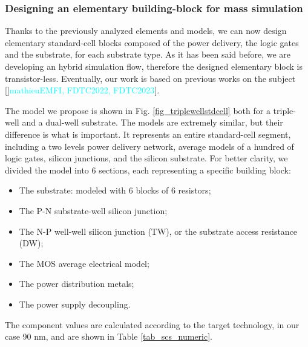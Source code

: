 		\subsubsection{Designing an elementary building-block for mass simulation}
		Thanks to the previously analyzed elements and models, we can now design elementary standard-cell blocks composed of the power delivery, the logic gates and the substrate, for each substrate type.
		As it has been said before, we are developing an hybrid simulation flow, therefore the designed elementary block is transistor-less.
		Eventually, our work is based on previous works on the subject []\textcolor{cyan}{mathieuEMFI, FDTC2022, FDTC2023}].
		
		
		
		The model we propose is shown in Fig. \ref{fig_triplewellstdcell} both for a triple-well and a dual-well substrate.
		The models are extremely similar, but their difference is what is important.
		It represents an entire standard-cell segment, including a two levels power delivery network, average models of a hundred of logic gates, silicon junctions, and the silicon substrate.
		For better clarity, we divided the model into 6 sections, each representing a specific building block:
		\begin{itemize}
			\item {} The substrate: modeled with 6 blocks of 6 resistors;
			\item {} The P-N substrate-well silicon junction;
			\item {} The N-P well-well silicon junction (TW), or the substrate access resistance (DW);
			\item {}  The MOS average electrical model;
			\item {}  The power distribution metals;
			\item {} The power supply decoupling.
		\end{itemize}
		
		The component values are calculated according to the target technology, in our case 90 nm, and are shown in Table \ref{tab_scs_numeric}.
		
